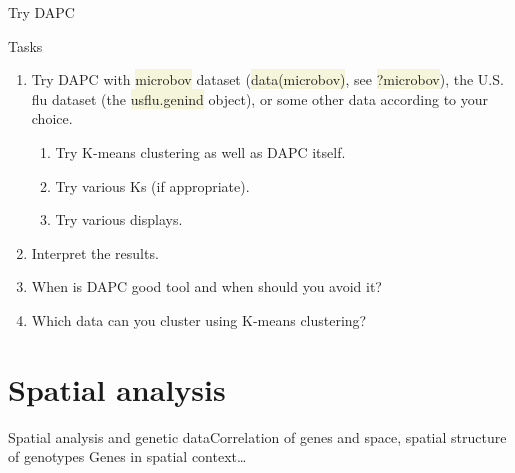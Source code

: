 \documentclass[compress, ucs, xelatex, 11pt, xcolor=svgnames, aspectratio=169,
	hyperref={
		bookmarks=true,
		unicode=true,
		colorlinks=true,
		pdftitle={Molecular data in R},
		plainpages=false,
		pdfauthor={Vojtech Zeisek},
		pdfsubject={Course about phylogeny and evolution in R},
		pdfcreator={XeLaTeX},
		pdfkeywords={R, evolution, phylogeny, molecular data},
		linkcolor=Crimson, %
		anchorcolor=Magenta, %
		citecolor=Magenta, %
		filecolor=Magenta, %
		menucolor=Magenta, %
		urlcolor=DodgerBlue, %
		pdftex},
	url={hyphens, lowtilde} %
	]{beamer}
\renewcommand{\texttt}[1]{\colorbox{Beige}{{\ttfamily #1}}}
\begin{document}
\begin{frame}{Try DAPC}
	\begin{exampleblock}{Tasks}
		\begin{enumerate}
			\item Try DAPC with \texttt{microbov} dataset (\texttt{data(microbov)}, see \texttt{?microbov}), the U.S. flu dataset (the \texttt{usflu.genind} object), or some other data according to your choice.
			\begin{enumerate}
				\item Try K-means clustering as well as DAPC itself.
				\item Try various Ks (if appropriate).
				\item Try various displays.
			\end{enumerate}
			\item Interpret the results.
			\item When is DAPC good tool and when should you avoid it?
			\item Which data can you cluster using K-means clustering?
		\end{enumerate}
	\end{exampleblock}
\end{frame}

\section{Spatial analysis}

\begin{frame}[fragile]{Spatial analysis and genetic data}{Correlation of genes and space, spatial structure of genotypes}
	Genes in spatial context\ldots
	\tableofcontents[currentsection, sectionstyle=show/hide, hideothersubsections]
\end{frame}
\end{document}
